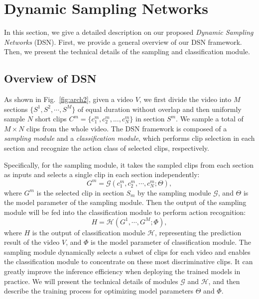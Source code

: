 \documentclass[journal]{IEEEtran}
\begin{document}
\section{Dynamic Sampling Networks}
\label{sec:dsn}

In this section, we give a detailed description on our proposed {\em Dynamic Sampling Networks} (DSN).
First, we provide a general overview of our DSN framework.
Then, we present the technical details of the sampling and classification module.

\subsection{Overview of DSN}
As shown in Fig.~\ref{fig:arch2}, given a video $V$, we first divide the video into $M$ sections $\{S^1, S^2, \cdots, S^M\}$ of equal duration without overlap and then uniformly sample $N$ short clips  $C^m=\{c^m_1,c^m_2,...,c^m_N\}$ in section $S^m$.
We sample a total of $M \times N$ clips from the whole video.
The DSN framework is composed of a {\em sampling module} and a {\em classification module}, which performs clip selection in each section and recognize the action class of selected clips, respectively.

Specifically, for the sampling module, it takes the sampled clips from each section as inputs and selects a single clip in each section independently:
\begin{equation}
G^m =\mathcal{G}(c_1^m, c_2^m, \cdots, c_N^m; \Theta),
\label{equ:g}
\end{equation}
where $G^m$ is the selected clip in section $S_m$ by the sampling module $\mathcal{G}$, and $\Theta$ is the model parameter of the sampling module.
Then the output of the sampling module will be fed into the classification module to perform action recognition:
\begin{equation}
H = \mathcal{H}(G^1,\cdots,G^M; \Phi),
\label{equ:h}
\end{equation}
where $H$ is the output of classification module $\mathcal{H}$, representing the prediction result of the video $V$, and $\Phi$ is the model parameter of classification module.
The sampling module dynamically selects a subset of clips for each video and enables the classification module to concentrate on these most discriminative clips. It can greatly improve the inference efficiency when deploying the trained models in practice.
We will present the technical details of modules $\mathcal{G}$ and $\mathcal{H}$, and then describe the training process for optimizing model parameters $\Theta$ and $\Phi$.
\end{document}
